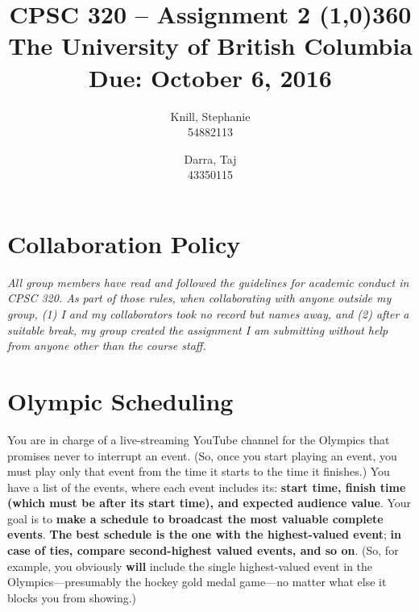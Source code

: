 \documentclass[11pt, oneside]{article}   	%
\theoremstyle{definition}
\theoremstyle{remark}
\begin{document}
\title{CPSC 320 -- Assignment 2
\line(1,0){360} \\               %
\vspace{0.5cm}
\large
The University of British Columbia \\
Due: October 6, 2016
\vspace{1cm}}


\author{
Knill, Stephanie\\
54882113
\and
Darra, Taj \\
43350115
}

\date{}                    %
\maketitle
\thispagestyle{empty}    %

\medskip 
\section*{Collaboration Policy}
\emph{All group members have read and followed the guidelines for academic conduct in CPSC 320. As part of those rules, when collaborating with anyone outside my group, (1) I and my collaborators took no record but names away, and (2) after a suitable break, my group created the assignment I am submitting without help from anyone other than the course staff.}




\cleardoublepage
\section{Olympic Scheduling}
You are in charge of a live-streaming YouTube channel for the Olympics
that promises never to interrupt an event. (So, once you start playing
an event, you must play only that event from the time it starts to the
time it finishes.) You have a list of the events, where each event
includes its: \textbf{start time, finish time (which must be after its start time), and expected audience value}. Your goal is to \textbf{make a schedule to broadcast the most valuable complete events}. \textbf{The best schedule is the one with the highest-valued event}; \textbf{in case of ties, compare second-highest valued events, and so on}. (So, for example, you
obviously \textbf{will} include the single highest-valued event in the
Olympics---presumably the hockey gold medal game---no matter what else
it blocks you from showing.)
\end{document}
